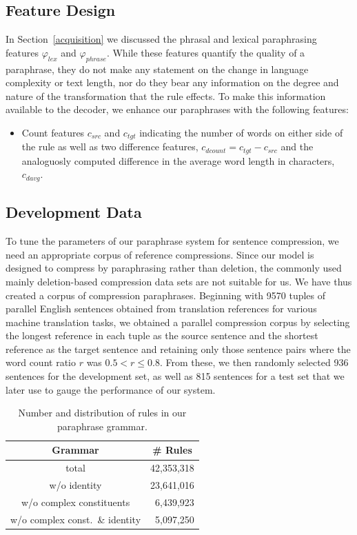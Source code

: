 \documentclass[11pt]{article}
\begin{document}
\subsection{Feature Design}
In Section~\ref{acquisition} we discussed the phrasal and lexical
paraphrasing features $\varphi_{\mathit{lex}}$ and
$\varphi_{\mathit{phrase}}$. While these features quantify the quality
of a paraphrase, they do not make any statement on the change in
language complexity or text length, nor do they bear any information
on the degree and nature of the transformation that the rule
effects. To make this information available to the decoder, we enhance
our paraphrases with the following features:
\begin{itemize}
\item Count features $c_{\mathit{src}}$ and $c_{\mathit{tgt}}$
  indicating the number of words on either side of the rule as well as
  two difference features, $c_{\mathit{dcount}} = c_{\mathit{tgt}} -
  c_{\mathit{src}}$ and the analoguosly computed difference in the
  average word length in characters, $c_{\mathit{davg}}$.
\end{itemize}


\subsection{Development Data}
\label{dev-data-and-objective-functions}
To tune the parameters of our paraphrase system for sentence
compression, we need an appropriate corpus of reference
compressions. Since our model is designed to compress by paraphrasing
rather than deletion, the commonly used mainly deletion-based
compression data sets are not suitable for us. We have thus created a
corpus of compression paraphrases. Beginning with 9570 tuples of
parallel English sentences obtained from translation references for
various machine translation tasks, we obtained a parallel compression
corpus by selecting the longest reference in each tuple as the source
sentence and the shortest reference as the target sentence and
retaining only those sentence pairs where the word count ratio $r$ was
$0.5 < r \leq 0.8$. From these, we then randomly selected 936
sentences for the development set, as well as 815 sentences for a test
set that we later use to gauge the performance of our system.

\begin{table}
\begin{center}
\begin{tabular}{|c|r|}
  \hline
  Grammar & \multicolumn{1}{c|}{\# Rules} \\
  \hline
  total & 42,353,318 \\
  w/o identity & 23,641,016 \\
  w/o complex constituents & 6,439,923 \\
  w/o complex const.\ \& identity & 5,097,250 \\
  \hline
\end{tabular}
\end{center}
\caption{Number and distribution of rules in our paraphrase grammar.}
\label{grammar_stats}
\end{table}
\end{document}
